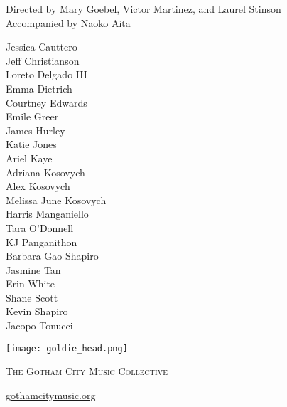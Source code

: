 \documentclass{article}[10pt]
\newcommand{\lion}{
    {\texttt{[image: goldie\_head.png]}}
}
\begin{document}
\begin{titlepage}
\begin{center}
{\begin{small}
Directed by
Mary Goebel,
Victor Martinez,
and
Laurel Stinson\\
Accompanied by Naoko Aita
\end{small}
\vspace{-0.1in}
\begin{multicols*}{3}
\begin{center}
    \begin{small}
        Jessica Cauttero \\ 
        Jeff Christianson \\
        Loreto Delgado III \\        
        Emma Dietrich \\   
        Courtney Edwards \\
        Emile Greer \\        
        James Hurley \\        
        Katie Jones \\        
        Ariel Kaye \\
        Adriana Kosovych \\        
        Alex Kosovych \\        
        {Melissa June Kosovych} \\
        Harris Manganiello \\
        Tara O'Donnell \\
        KJ Panganithon \\
        {Barbara Gao Shapiro} \\
        Jasmine Tan \\
        Erin White \\
        Shane Scott \\        
        Kevin Shapiro \\        
        Jacopo Tonucci
    \end{small}
\end{center}
\end{multicols*}
}


\newpage

{\lion}

    {\scshape \large 
        The Gotham City Music Collective
    \par}


    {\large{
        \href{https://gothamcitymusic.org}{gothamcitymusic.org}
    }}

\vspace{0.1in}
    
\begin{minipage}{4in}
    

\end{minipage}
\end{center}
\end{titlepage}
\end{document}

